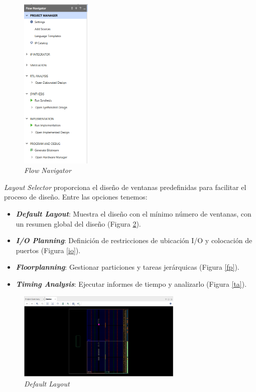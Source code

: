 \begin{figure}[H]
    \centering
    \includegraphics[width = 0.3\textwidth]{imagenes/flownavigator.png}
    \caption{\textit{Flow Navigator}}\label{flownavigator}
\end{figure}

\textit{Layout Selector} proporciona el diseño de ventanas predefinidas para facilitar el proceso de diseño. Entre las opciones tenemos:
\begin{itemize}
    \item \textit{\textbf{Default Layout}}: Muestra el diseño con el mínimo número de ventanas, con un resumen global del diseño (Figura \ref{default}).
    \item \textit{\textbf{I/O Planning}}: Definición de restricciones de ubicación I/O y colocación de puertos (Figura \ref{io}).
    \item \textit{\textbf{Floorplanning}}: Gestionar particiones y tareas jerárquicas (Figura \ref{fp}).
    \item \textit{\textbf{Timing Analysis}}: Ejecutar informes de tiempo y analizarlo (Figura \ref{ta}).
\end{itemize} 

\begin{figure}[H]
    \centering
    \includegraphics[width = 0.7\textwidth]{imagenes/default.png}
    \caption{\textit{Default Layout}}\label{default}
\end{figure}

